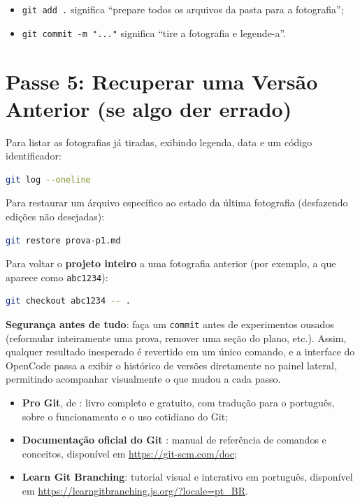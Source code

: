 \begin{itemize}
  \item \texttt{git add .} significa ``prepare todos os arquivos da pasta para a fotografia'';
  \item \texttt{git commit -m "..."} significa ``tire a fotografia e legende-a''.
\end{itemize}

\section{Passe 5: Recuperar uma Vers{\~a}o Anterior (se algo der errado)}

Para listar as fotografias j{\'a} tiradas, exibindo legenda, data e um c{\'o}digo identificador:
\begin{lstlisting}[language=bash, caption={Listando o hist{\'o}rico de vers{\~o}es}]
git log --oneline
\end{lstlisting}

Para restaurar um \'arquivo espec\'ifico ao estado da \'ultima fotografia (desfazendo edi{\c c}{\~o}es n{\~a}o desejadas):
\begin{lstlisting}[language=bash, caption={Restaurando um arquivo para a \'ultima vers{\~a}o salva}]
git restore prova-p1.md
\end{lstlisting}

Para voltar o \textbf{projeto inteiro} a uma fotografia anterior (por exemplo, a que aparece como \texttt{abc1234}):
\begin{lstlisting}[language=bash, caption={Restaurando o projeto a uma vers{\~a}o anterior}]
git checkout abc1234 -- .
\end{lstlisting}

\begin{dicaopencode}
\textbf{Seguran{\c c}a antes de tudo}: fa{\c c}a um \texttt{commit} antes de experimentos ousados (reformular inteiramente uma prova, remover uma se{\c c}{\~a}o do plano, etc.). Assim, qualquer resultado inesperado {\'e} revertido em um {\'u}nico comando, e a interface do OpenCode passa a exibir o hist{\'o}rico de vers{\~o}es diretamente no painel lateral, permitindo acompanhar visualmente o que mudou a cada passo.
\end{dicaopencode}

\begin{tcolorbox}[colback=white, colframe=boxborder, arc=1mm, title={Para saber mais sobre Git}]
\small
\begin{itemize}
  \item \textbf{Pro Git}, de : livro completo e gratuito, com tradu{\c c}{\~a}o para o portugu{\^e}s, sobre o funcionamento e o uso cotidiano do Git;
  \item \textbf{Documenta{\c c}{\~a}o oficial do Git} \cite{git2026doc}: manual de refer{\^e}ncia de comandos e conceitos, dispon{\'i}vel em \url{https://git-scm.com/doc};
  \item \textbf{Learn Git Branching}: tutorial visual e interativo em portugu{\^e}s, dispon{\'i}vel em \url{https://learngitbranching.js.org/?locale=pt_BR}.
\end{itemize}
\end{tcolorbox}
